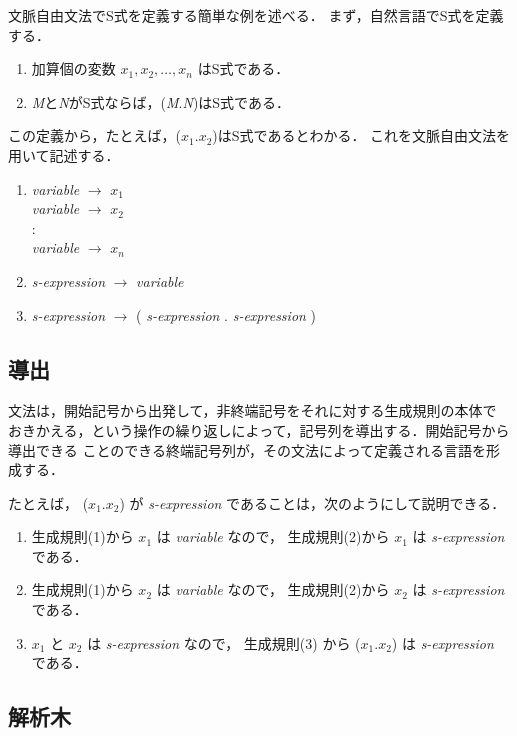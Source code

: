 \documentclass{jarticle}
\begin{document}
文脈自由文法でS式を定義する簡単な例を述べる．
まず，自然言語でS式を定義する．
\begin{enumerate}
\item 加算個の変数 $x_1,x_2,\ldots,x_n$ はS式である．
\item {\sl M}と{\sl N}がS式ならば，({\sl M}.{\sl N})はS式である．
\end{enumerate}
この定義から，たとえば，($x_1$.$x_2$)はS式であるとわかる．
これを文脈自由文法を用いて記述する．
\begin{enumerate}
\item {\it variable} $\longrightarrow$ $x_1$\\
      {\it variable} $\longrightarrow$ $x_2$\\
      :\\
      {\it variable} $\longrightarrow$ $x_n$
\item {\it s-expression} $\longrightarrow$ {\it variable}
\item {\it s-expression} $\longrightarrow$ ( {\it s-expression} . {\it s-expression} )
\end{enumerate}

\subsection{導出}

文法は，開始記号から出発して，非終端記号をそれに対する生成規則の本体で
おきかえる，という操作の繰り返しによって，記号列を導出する．開始記号から導出できる
ことのできる終端記号列が，その文法によって定義される言語を形成する．

たとえば， ($x_1$.$x_2$) が {\it s-expression} であることは，次のようにして説明できる．

\begin{enumerate}
\item 生成規則(1)から $x_1$ は {\it variable} なので，
      生成規則(2)から $x_1$ は {\it s-expression} である．
\item 生成規則(1)から  $x_2$ は {\it variable} なので，
      生成規則(2)から $x_2$ は {\it s-expression} である．
\item $x_1$ と $x_2$ は {\it s-expression} なので，
      生成規則(3) から ($x_1$.$x_2$) は {\it s-expression} である．
\end{enumerate}

\subsection{解析木}
\end{document}
